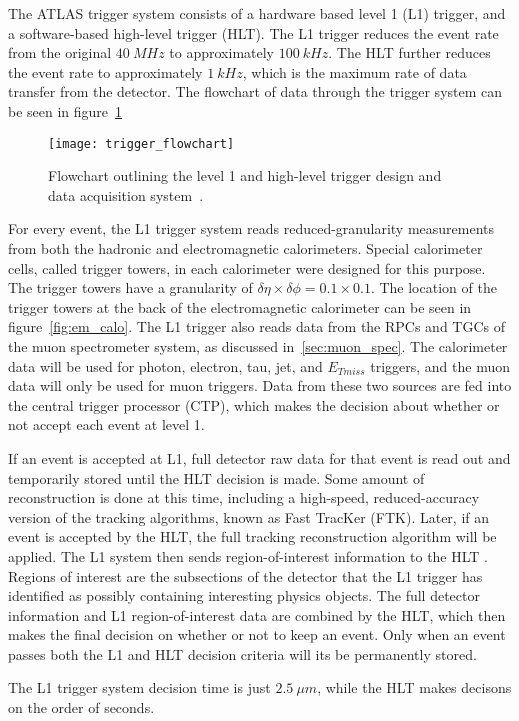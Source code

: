 The ATLAS trigger system consists of a hardware based level 1 (L1) trigger, and a software-based high-level trigger (HLT).
The L1 trigger reduces the event rate from the original $40~MHz$ to approximately $100~kHz$.
The HLT further reduces the event rate to approximately $1~kHz$, which is the maximum rate of data transfer from the detector.
The flowchart of data through the trigger system can be seen in figure~\ref{fig:trigger_flowchart}

\begin{figure}[!ht]\centering
\texttt{[image: trigger\_flowchart]}
\caption{Flowchart outlining the level 1 and high-level trigger design and data acquisition system~\cite{atlas-trigger}.}
\label{fig:trigger_flowchart}
\end{figure}

For every event, the L1 trigger system reads reduced-granularity measurements from both the hadronic and electromagnetic calorimeters.
Special calorimeter cells, called trigger towers, in each calorimeter were designed for this purpose.
The trigger towers have a granularity of $\delta \eta \times \delta \phi = 0.1 \times 0.1$.
The location of the trigger towers at the back of the electromagnetic calorimeter can be seen in figure~\ref{fig:em_calo}.
The L1 trigger also reads data from the RPCs and TGCs of the muon spectrometer system, as discussed in~\ref{sec:muon_spec}.
The calorimeter data will be used for photon, electron, tau, jet, and $E_{Tmiss}$ triggers, and the muon data will only be used for muon triggers.
Data from these two sources are fed into the central trigger processor (CTP),
which makes the decision about whether or not accept each event at level 1.

If an event is accepted at L1, full detector raw data for that event is read out and temporarily stored until the HLT decision is made.
Some amount of reconstruction is done at this time, including a high-speed,
reduced-accuracy version of the tracking algorithms, known as Fast TracKer (FTK).
Later, if an event is accepted by the HLT, the full tracking reconstruction algorithm will be applied.
The L1 system then sends region-of-interest information to the HLT .
Regions of interest are the subsections of the detector that the L1 trigger has identified as possibly containing interesting physics objects.
The full detector information and L1 region-of-interest data are combined by the HLT,
which then makes the final decision on whether or not to keep an event.
Only when an event passes both the L1 and HLT decision criteria will its be permanently stored.

The L1 trigger system decision time is just $2.5~\mu m$, while the HLT makes decisons on the order of seconds.